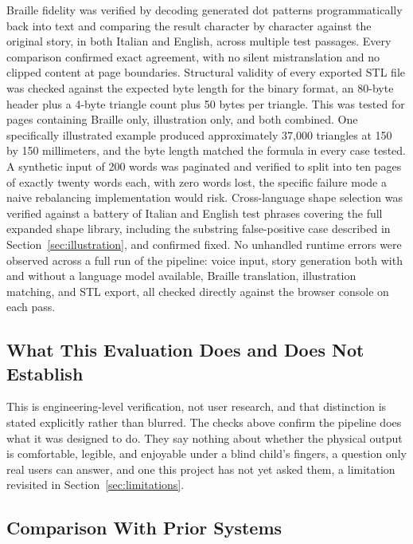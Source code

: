 \documentclass[conference]{IEEEtran}
\begin{document}
Braille fidelity was verified by decoding generated dot patterns programmatically back into text and comparing the result character by character against the original story, in both Italian and English, across multiple test passages. Every comparison confirmed exact agreement, with no silent mistranslation and no clipped content at page boundaries. Structural validity of every exported STL file was checked against the expected byte length for the binary format, an 80-byte header plus a 4-byte triangle count plus 50 bytes per triangle. This was tested for pages containing Braille only, illustration only, and both combined. One specifically illustrated example produced approximately 37{,}000 triangles at 150 by 150 millimeters, and the byte length matched the formula in every case tested. A synthetic input of 200 words was paginated and verified to split into ten pages of exactly twenty words each, with zero words lost, the specific failure mode a naive rebalancing implementation would risk. Cross-language shape selection was verified against a battery of Italian and English test phrases covering the full expanded shape library, including the substring false-positive case described in Section~\ref{sec:illustration}, and confirmed fixed. No unhandled runtime errors were observed across a full run of the pipeline: voice input, story generation both with and without a language model available, Braille translation, illustration matching, and STL export, all checked directly against the browser console on each pass.

\subsection{What This Evaluation Does and Does Not Establish}

This is engineering-level verification, not user research, and that distinction is stated explicitly rather than blurred. The checks above confirm the pipeline does what it was designed to do. They say nothing about whether the physical output is comfortable, legible, and enjoyable under a blind child's fingers, a question only real users can answer, and one this project has not yet asked them, a limitation revisited in Section~\ref{sec:limitations}.

\subsection{Comparison With Prior Systems}
\end{document}
